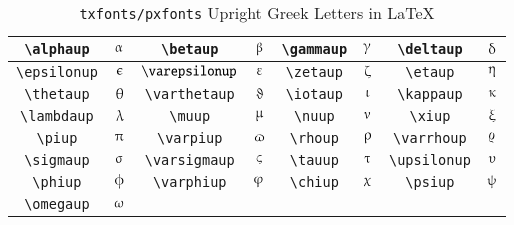 \begin{table}
\caption{\texttt{txfonts/pxfonts} Upright Greek Letters in \LaTeX}
\begin{center}
\begin{tabular}{|c|c|c|c|c|c|c|c|} \hline
\verb"\alphaup"  & $\alphaup$ & \verb"\betaup" & $\betaup$ & \verb"\gammaup" & $\gammaup$ & \verb"\deltaup" & $\deltaup$  \bigstrut \\ \hline
\verb"\epsilonup"  & $\epsilonup$ & $\verb"\varepsilonup"$ & $\varepsilonup$ & \verb"\zetaup" & $\zetaup$ & \verb"\etaup" & $\etaup$   \bigstrut \\ \hline
\verb"\thetaup"  & $\thetaup$ & \verb"\varthetaup" & $\varthetaup$ & \verb"\iotaup" & $\iotaup$ & \verb"\kappaup" & $\kappaup$   \bigstrut \\ \hline
\verb"\lambdaup"  & $\lambdaup$ & \verb"\muup" & $\muup$ & \verb"\nuup" & $\nuup$ & \verb"\xiup" & $\xiup$   \bigstrut \\ \hline
\verb"\piup"  & $\piup$ & \verb"\varpiup" & $\varpiup$ & \verb"\rhoup" & $\rhoup$ & \verb"\varrhoup" & $\varrhoup$   \bigstrut \\ \hline
\verb"\sigmaup"  & $\sigmaup$ & \verb"\varsigmaup" & $\varsigmaup$ & \verb"\tauup"  & $\tauup$ & \verb"\upsilonup" & $\upsilonup$   \bigstrut \\ \hline
\verb"\phiup"  & $\phiup$ & \verb"\varphiup"  & $\varphiup$ & \verb"\chiup" & $\chiup$ & \verb"\psiup" & $\psiup$   \bigstrut \\ \hline
\verb"\omegaup"  & $\omegaup$ &  &  &  &  &  &    \bigstrut \\ \hline
\end{tabular}
\end{center}
\label{tab_math_6}
\end{table}


